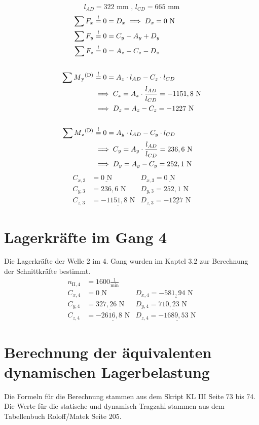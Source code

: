 \begin{itemize}
\begin{center}
	\end{center}
\[l_{AD} =322\text{ mm} \text{ , } l_{CD} = 665\text{ mm} \]
	\begin{align*}
	\sum F_x &\overset{!}{=} 0 =  D_x \implies D_x =  0 \text{ N} \\
	\sum F_y &\overset{!}{=} 0 = C_y -A_y +D_y \\ 
	\sum F_z &\overset{!}{=} 0 = A_z - C_z - D_z\\ \\
	\sum M\textsubscript{y}\textsuperscript{(D)} &\overset{!}{=} 0 = A_z \cdot l_{AD} - C_z \cdot l_{CD}\\ 
	&\implies C_z = A_z \cdot \frac{l_{AD}}{l_{CD}} = -1151,8 \text { N} \\ 
	& \implies D_z = A_z - C_z = -1227 \text{ N}\\ \\
	\sum M\textsubscript{z}\textsuperscript{(D)} &\overset{!}{=} 0 = A_y \cdot l_{AD} - C_y \cdot l_{CD} \\ 
	&\implies C_y = A_y \cdot \frac{l_{AD}}{l_{CD}} = 236,6 \text{ N}\\ 
	& \implies D_y =   A_y - C_y = 252,1\text{ N}
	\end{align*}
	\begin{align*}
	C_{x,3} &= \underline{0\text{ N}} & D_{x,3}= \underline{0\text{ N}}\\
	C_{y,3} &= \underline{236,6\text{ N}} & D_{y,3}= \underline{252,1\text{ N}}\\
	C_{z,3} &= \underline{-1151,8\text{ N}} & D_{z,3}= \underline{-1227\text{ N}}
	\end{align*}
\end{itemize}
\section{Lagerkräfte im Gang 4}
Die Lagerkräfte der Welle 2 im 4. Gang wurden im Kaptel 3.2 zur Berechnung der Schnittkräfte bestimmt.
\begin{align*}
	n_{\mathrm{II},4} &= 1600\frac{1}{\text{min}} \\
	C_{x,4} &= \underline{0\text{ N}} & D_{x,4}= \underline{-581,94\text{ N}}\\
	C_{y,4} &= \underline{327,26\text{ N}} & D_{y,4}= \underline{710,23\text{ N}}\\
	C_{z,4} &= \underline{-2616,8\text{ N}} & D_{z,4}= \underline{-1689,53\text{ N}}
\end{align*}
\section{Berechnung der äquivalenten dynamischen Lagerbelastung}
Die Formeln für die Berechnung stammen aus dem Skript KL III Seite 73 bis 74.
Die Werte für die statische und dynamisch Tragzahl stammen aus dem Tabellenbuch Roloff/Matek  Seite 205.
